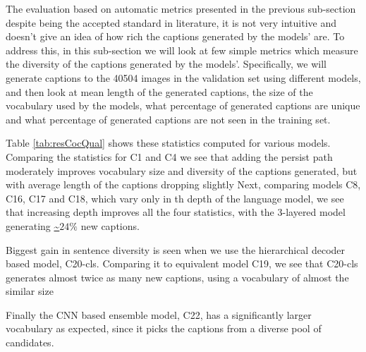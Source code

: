The evaluation based on automatic metrics presented in the previous sub-section
despite being the accepted standard in literature, it is not very intuitive and
doesn't give an idea of how rich the captions generated by the models' are.
To address this, in this sub-section we will look at few simple metrics which
measure the diversity of the captions generated by the models'.
Specifically, we will generate captions to the 40504 images in the validation
set using different models, and then look at mean length of the generated
captions, the size of the vocabulary used by the models, what percentage of
generated captions are unique and what percentage of generated captions are not
seen in the training set.

Table \ref{tab:resCocQual} shows these statistics computed for various
models. 
Comparing the statistics for C1 and C4 we see that adding the persist path
moderately improves vocabulary size and diversity of the captions generated,
but with average length of the captions dropping slightly
Next, comparing models C8, C16, C17 and C18, which vary only in th depth of the
language model, we see that increasing depth improves all the four statistics,
with the 3-layered model generating \url{~}$24\%$ new captions.

Biggest gain in sentence diversity is seen when we use the hierarchical decoder
based model, C20-cls. 
Comparing it to equivalent model C19, we see that C20-cls generates almost twice
as many new captions, using a vocabulary of almost the similar size

Finally the CNN based ensemble model, C22, has a significantly larger vocabulary
as expected, since it picks the captions from a diverse pool of candidates.

